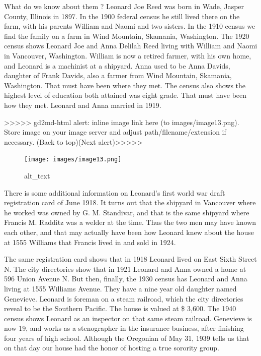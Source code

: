 \documentclass[
  12pt,
]{book}
\begin{document}
What do we know about them ? Leonard Joe Reed was born in Wade, Jasper County, Illinois in 1897. In the 1900 federal census he still lived there on the farm, with his parents William and Naomi and two sisters. In the 1910 census we find the family on a farm in Wind Mountain, Skamania, Washington. The 1920 census shows Leonard Joe and Anna Delilah Reed living with William and Naomi in Vancouver, Washington. William is now a retired farmer, with his own home, and Leonard is a machinist at a shipyard. Anna used to be Anna Davids, daughter of Frank Davids, also a farmer from Wind Mountain, Skamania, Washington. That must have been where they met. The census also shows the highest level of education both attained was eight grade. That must have been how they met. Leonard and Anna married in 1919.

{\textgreater\textgreater\textgreater\textgreater\textgreater{} gd2md-html alert: inline image link here (to images/image13.png). Store image on your image server and adjust path/filename/extension if necessary. }(Back to top)(Next alert){\textgreater\textgreater\textgreater\textgreater\textgreater{} }

\begin{figure}
\centering
\texttt{[image: images/image13.png]}
\caption{alt\_text}
\end{figure}

There is some additional information on Leonard's first world war draft registration card of June 1918. It turns out that the shipyard in Vancouver where he worked was owned by G. M. Standivar, and that is the same shipyard where Francis M. Radditz was a welder at the time. Thus the two men may have known each other, and that may actually have been how Leonard knew about the house at 1555 Williams that Francis lived in and sold in 1924.

The same registration card shows that in 1918 Leonard lived on East Sixth Street N. The city directories show that in 1921 Leonard and Anna owned a home at 596 Union Avenue N. But then, finally, the 1930 census has Leonard and Anna living at 1555 Williams Avenue. They have a nine year old daughter named Genevieve. Leonard is foreman on a steam railroad, which the city directories reveal to be the Southern Pacific. The house is valued at \$ 3,600. The 1940 census shows Leonard as an inspector on that same steam railroad. Genevieve is now 19, and works as a stenographer in the insurance business, after finishing four years of high school. Although the Oregonian of May 31, 1939 tells us that on that day our house had the honor of hosting a true sorority group.
\end{document}
